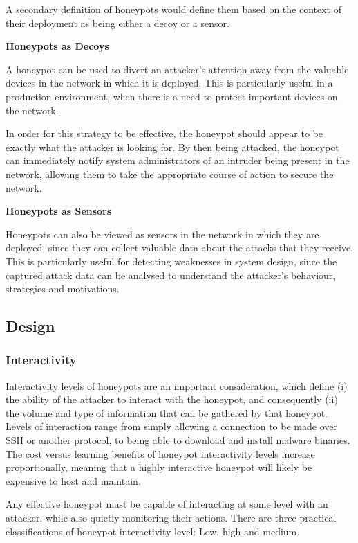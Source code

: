 A secondary definition of honeypots would define them based on the context of their deployment as being either a decoy or a sensor.

\bullet \textbf{Honeypots as Decoys}

A honeypot can be used to divert an attacker’s attention away from the valuable devices in the network in which it is deployed. This is particularly useful in a production environment, when there is a need to protect important devices on the network. 

In order for this strategy to be effective, the honeypot should appear to be exactly what the attacker is looking for. By then being attacked, the honeypot can immediately notify system administrators of an intruder being present in the network, allowing them to take the appropriate course of action to secure the network.

\bullet \textbf{Honeypots as Sensors}

Honeypots can also be viewed as sensors in the network in which they are deployed, since they can collect valuable data about the attacks that they receive. This is particularly useful for detecting weaknesses in system design, since the captured attack data can be analysed to understand the attacker’s behaviour, strategies and motivations.

\subsection{Design}

\subsubsection{Interactivity}

Interactivity levels of honeypots are an important consideration, which define (i) the ability of the attacker to interact with the honeypot, and consequently (ii) the volume and type of information that can be gathered by that honeypot. Levels of interaction range from simply allowing a connection to be made over SSH or another protocol, to being able to download and install malware binaries.  The cost versus learning benefits of honeypot interactivity levels increase proportionally, meaning that a highly interactive honeypot will likely be expensive to host and maintain. 

Any effective honeypot must be capable of interacting at some level with an attacker, while also quietly monitoring their actions. There are three practical classifications of honeypot interactivity level: Low, high and medium.

